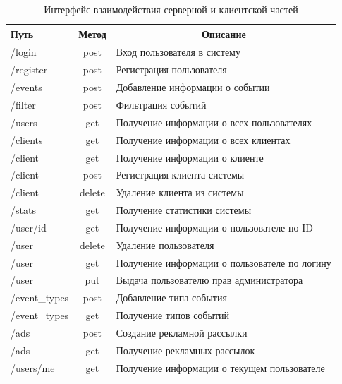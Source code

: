 \begin{table}[H]
\begin{center}
\caption{\label{table:api} Интерфейс взаимодействия серверной и клиентской частей}
\begin{tabular}{|l|c|l|} 
\hline
Путь          & Метод  & \multicolumn{1}{c|}{Описание}                     \\ \hline
/login        & post   & Вход пользователя в систему                       \\ \hline
/register     & post   & Регистрация пользователя                          \\ \hline
/events       & post   & Добавление информации о событии                   \\ \hline
/filter       & post   & Фильтрация событий                                \\ \hline
/users        & get    & Получение информации о всех пользователях \\ \hline
/clients      & get    & Получение информации о всех клиентах      \\ \hline
/client       & get    & Получение информации о клиенте            \\ \hline
/client       & post   & Регистрация клиента системы                       \\ \hline
/client       & delete & Удаление клиента из системы                       \\ \hline
/stats        & get    & Получение статистики системы                      \\ \hline
/user/id      & get    & Получение информации о пользователе по ID         \\ \hline
/user         & delete & Удаление пользователя                             \\ \hline
/user         & get    & Получение информации о пользователе по логину     \\ \hline
/user         & put    & Выдача пользователю прав администратора           \\ \hline
/event\_types & post   & Добавление типа события                           \\ \hline
/event\_types & get    & Получение типов событий                           \\ \hline
/ads          & post   & Создание рекламной рассылки                       \\ \hline
/ads          & get    & Получение рекламных рассылок                      \\ \hline
/users/me     & get    & Получение информации о текущем пользователе       \\ \hline
\end{tabular}
\end{center}
\end{table}


